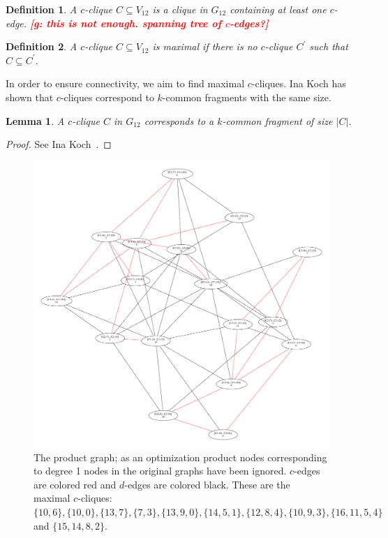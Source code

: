 \documentclass[11pt]{article}
\newcommand{\todo}[1]{\xspace{\bfseries\sffamily\textcolor{red}{[#1]}}\xspace}
\newtheorem{definition}{Definition}[section]
\newtheorem{lemma}[theorem]{Lemma}
\begin{document}
\begin{definition}
A \emph{$c$-clique} $C \subseteq V_{12}$ is a clique in $G_{12}$ containing at
least one $c$-edge. \todo{g: this is not enough. spanning tree of $c$-edges?}
\end{definition}

\begin{definition}
A $c$-clique $C \subseteq V_{12}$ is \emph{maximal} if there is no
$c$-clique $C^\prime$ such that $C \subseteq C^\prime$.
\end{definition}

In order to ensure connectivity, we aim to find maximal $c$-cliques. Ina Koch
has shown that $c$-cliques correspond to $k$-common fragments with the same size.

\begin{lemma}
A $c$-clique $C$ in $G_{12}$ corresponds to a $k$-common fragment of size $|C|$.
\end{lemma}
\begin{proof}
See Ina Koch~\cite{Koch:2001wi}.
\end{proof}

\begin{figure}
  \center
  \includegraphics[width=1.1\textwidth]{images/product}
  \caption{The product graph; as an optimization product nodes corresponding to
    degree 1 nodes in the original graphs have been ignored. $c$-edges are
    colored red and $d$-edges are colored black. These are the maximal
    $c$-cliques: $\{10,6\}, \{10,0\}, \{13, 7\},
    \{7, 3\}, \{13, 9, 0\}, \{14, 5, 1\}, \{12, 8, 4\}, \{10, 9, 3\}, \{16, 11,
    5, 4\}$ and $\{15, 14, 8, 2\}$.}
  \label{fig:product}
\end{figure}
\end{document}
